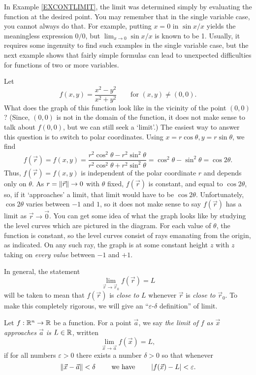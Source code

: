 In Example \ref{EXCONTLIMIT}, the limit was determined simply by evaluating the
function at the desired point.  You may remember that in the single
variable case, you cannot always do that.
For example, putting $x = 0$ in  $\sin x/x$ yields the meaningless
expression $0/0$, but $\lim_{x \to 0} \sin x/x$ is known to be 1.
Usually, it requires some ingenuity to find such examples in the single
variable case, but the next example shows that fairly simple formulas
can lead to unexpected difficulties for functions of two or more
variables.

\begin{example}
	\label{EXDISCONT}
	Let
	\[
	   f(x,y) = \frac{x^2 - y^2}{x^2 + y^2}\qquad\text{for } (x,y) \not= (0,0).
	\]
	 What does the graph of this function look like in the vicinity
	of the point $(0,0)$?   (Since, $(0,0)$ is not in the domain of
	the function, it does not make sense  to talk about
	$f(0,0)$, but we can still seek a `limit'.)  The easiest way to
	answer this question is to switch to polar coordinates.   Using
	$x = r\cos\theta, y = r\sin\theta$, we find
	\[
	f(\vec r) = f(x,y) = \frac{r^2\cos^2\theta - r^2\sin^2\theta}
	{r^2\cos^2\theta + r^2\sin^2\theta} = \cos^2\theta - \sin^2\theta
	 = \cos 2\theta.
	\]
	Thus, $f(\vec r) = f(x,y)$
	is independent of the polar coordinate $r$ and depends only
	on $\theta$.  As $r = \lVert\vec r\rVert \to 0$ with $\theta$ fixed, $f(\vec r)$
	is constant, and equal to $\cos 2\theta$, so, if  it `approaches'
	a limit, that limit would have to be $\cos 2\theta$.  
	Unfortunately, $\cos 2\theta$ varies between $-1$ and $1$, so it
	does not make sense to say $f(\vec r)$ has a limit as $\vec r \to \vec 0$.
	You can get some idea of what the graph looks like by studying the
	level curves which are pictured in the diagram.  For each value
	of $\theta$, the function is constant, so the level curves consist
	of rays emanating from the origin, as indicated.  On any such
	ray, the graph is at some constant height $z$ with $z$ taking on
	\emph{every value} between $-1$ and $+1$.
\end{example}

In general, the statement
\[
  \lim_{\vec r \to \vec r_0} f(\vec r) = L
\]
will be taken to mean that $f(\vec r)$ is \emph{close to} $L$ whenever
$\vec r$ is \emph{close to } $\vec r_0$.   To make this completely
rigorous, we will give an ``$\varepsilon$-$\delta$ definition'' of limit.
 
\begin{definition}[Limit]
	Let $f:\mathbb{R}^n\to \mathbb{R}$ be a function.  For a point $\vec a$,
	we say \emph{the limit of $f$ as $\vec x$ approaches
	$\vec a$ is $L\in\mathbb{R}$}, written
	\[
		\lim_{\vec x\to \vec a}f(\vec x)=L,
	\]
	if for all numbers $\varepsilon>0$ there exists a number
	$\delta >0$ so that whenever
	\[
		\lVert\vec x-\vec a\rVert<\delta\qquad\text{ we have }\qquad\lvert f(\vec x)-L\rvert<\varepsilon.
	\]
\end{definition}

